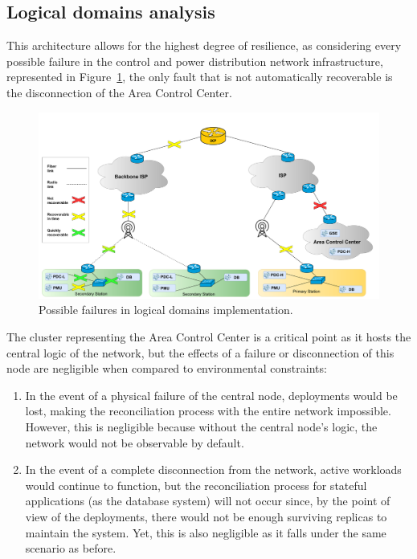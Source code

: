 \subsection{Logical domains analysis}

This architecture allows for the highest degree of resilience, as considering every possible failure in the control and power distribution network infrastructure, represented in Figure~\ref{fig:failures}, the only fault that is not automatically recoverable is the disconnection of the Area Control Center.

\begin{figure}[ht]\centering
\includegraphics[scale=0.20]{Pictures/failures}
\caption{Possible failures in logical domains implementation.}\label{fig:failures}
\end{figure}

The cluster representing the Area Control Center is a critical point as it hosts the central logic of the network, but the effects of a failure or disconnection of this node are negligible when compared to environmental constraints:

\begin{enumerate}
\item In the event of a physical failure of the central node, deployments would be lost, making the reconciliation process with the entire network impossible. However, this is negligible because without the central node's logic, the network would not be observable by default.
\item In the event of a complete disconnection from the network, active workloads would continue to function, but the reconciliation process for stateful applications (as the database system) will not occur since, by the point of view of the deployments, there would not be enough surviving replicas to maintain the system. Yet, this is also negligible as it falls under the same scenario as before.
\end{enumerate}

